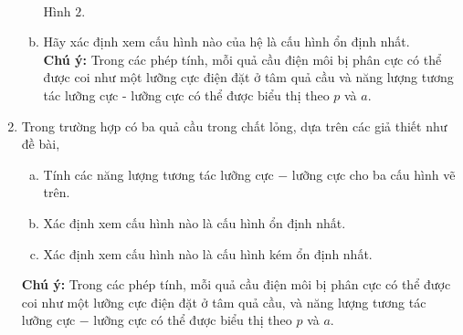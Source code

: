 \begin{vd}
\begin{enumerate}[1)]
\begin{enumerate}[a)]
\begin{center}
\\Hình $2$.
       \end{center}
       \item Hãy xác định xem cấu hình nào của hệ là cấu hình ổn định nhất.\\
        \textbf{Chú ý:} Trong các phép tính, mỗi quả cầu điện môi bị phân cực có thể được coi như một lưỡng cực điện đặt ở tâm quả cầu và năng lượng tương tác lưỡng cực - lưỡng cực có thể được biểu thị theo $p$ và $a$.
    \end{enumerate}
    \item Trong trường hợp có ba quả cầu trong chất lỏng, dựa trên các giả thiết như đề bài,
    \begin{enumerate}[a)]
        \item Tính các năng lượng tương tác lưỡng cực $-$ lưỡng cực cho ba cấu hình vẽ trên.
        \item Xác định xem cấu hình nào là cấu hình ổn định nhất.
        \item Xác định xem cấu hình nào là cấu hình kém ổn định nhất.
    \end{enumerate}
    \textbf{Chú ý:} Trong các phép tính, mỗi quả cầu điện môi bị phân cực có thể được coi như một lưỡng cực điện đặt ở tâm quả cầu, và năng lượng tương tác lưỡng cực $-$ lưỡng cực có thể được biểu thị theo $p$ và $a$.
\end{enumerate}
 \begin{center}



\begin{tikzpicture}[x=0.75pt,y=0.75pt,yscale=-1,xscale=1]


\end{tikzpicture}
\end{center}
\end{vd}
